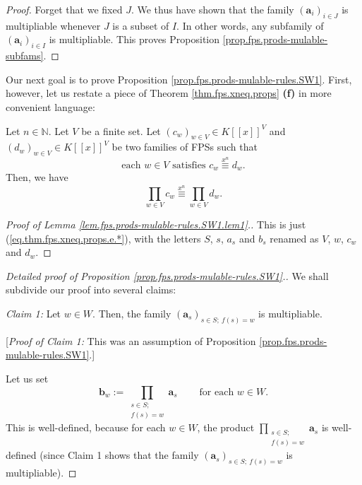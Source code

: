 \begin{fineprint}
\begin{proof}
Forget that we fixed $J$. We thus have shown that the family $\left(
\mathbf{a}_{i}\right)  _{i\in J}$ is multipliable whenever $J$ is a subset of
$I$. In other words, any subfamily of $\left(  \mathbf{a}_{i}\right)  _{i\in
I}$ is multipliable. This proves Proposition
\ref{prop.fps.prods-mulable-subfams}.
\end{proof}
\end{fineprint}

\begin{fineprint}
Our next goal is to prove Proposition \ref{prop.fps.prods-mulable-rules.SW1}.
First, however, let us restate a piece of Theorem \ref{thm.fps.xneq.props}
\textbf{(f)} in more convenient language:

\begin{lemma}
\label{lem.fps.prods-mulable-rules.SW1.lem1}Let $n\in\mathbb{N}$. Let $V$ be a
finite set. Let $\left(  c_{w}\right)  _{w\in V}\in K\left[  \left[  x\right]
\right]  ^{V}$ and $\left(  d_{w}\right)  _{w\in V}\in K\left[  \left[
x\right]  \right]  ^{V}$ be two families of FPSs such that
\[
\text{each }w\in V\text{ satisfies }c_{w}\overset{x^{n}}{\equiv}d_{w}.
\]
Then, we have%
\[
\prod_{w\in V}c_{w}\overset{x^{n}}{\equiv}\prod_{w\in V}d_{w}.
\]

\end{lemma}

\begin{proof}
[Proof of Lemma \ref{lem.fps.prods-mulable-rules.SW1.lem1}.]This is just
(\ref{eq.thm.fps.xneq.props.e.*}), with the letters $S$, $s$, $a_{s}$ and
$b_{s}$ renamed as $V$, $w$, $c_{w}$ and $d_{w}$.
\end{proof}

\begin{proof}
[Detailed proof of Proposition \ref{prop.fps.prods-mulable-rules.SW1}.]We
shall subdivide our proof into several claims:

\begin{statement}
\textit{Claim 1:} Let $w\in W$. Then, the family $\left(  \mathbf{a}%
_{s}\right)  _{s\in S;\ f\left(  s\right)  =w}$ is multipliable.
\end{statement}

[\textit{Proof of Claim 1:} This was an assumption of Proposition
\ref{prop.fps.prods-mulable-rules.SW1}.] \medskip

Let us set%
\begin{equation}
\mathbf{b}_{w}:=\prod_{\substack{s\in S;\\f\left(  s\right)  =w}%
}\mathbf{a}_{s}\ \ \ \ \ \ \ \ \ \ \text{for each }w\in W.
\label{pf.prop.fps.prods-mulable-rules.SW1.bw=}%
\end{equation}
This is well-defined, because for each $w\in W$, the product $\prod
_{\substack{s\in S;\\f\left(  s\right)  =w}}\mathbf{a}_{s}$ is well-defined
(since Claim 1 shows that the family $\left(  \mathbf{a}_{s}\right)  _{s\in
S;\ f\left(  s\right)  =w}$ is multipliable).


\end{proof}
\end{fineprint}
